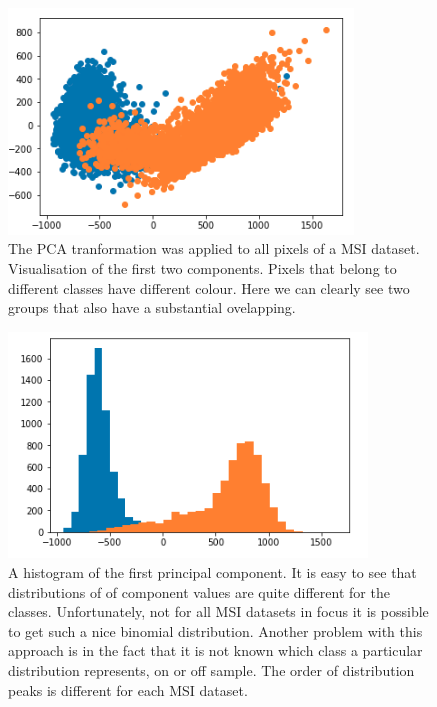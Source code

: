 \documentclass[a4paper]{article}
\begin{document}
\begin{figure}[H]
    \centering
        \includegraphics[width=\textwidth,height=6cm,keepaspectratio]{pca_2d_plot.png}
    \caption{The PCA tranformation was applied to all pixels of a MSI dataset.
    Visualisation of the first two components.
    Pixels that belong to different classes have different colour. Here we can clearly see two groups that also have
    a substantial ovelapping.}
\end{figure}

\begin{figure}[H]
    \centering
        \includegraphics[width=\textwidth,height=6cm,keepaspectratio]{pca_1d_plot.png}
    \caption{A histogram of the first principal component. It is easy to see that distributions of of component values are
    quite different for the classes. Unfortunately, not for all MSI datasets in focus it is possible to get such
    a nice binomial distribution. Another problem with this approach is in the fact that it is not known which 
    class a particular distribution represents, on or off sample. The order of distribution peaks is different for
    each MSI dataset.}
\end{figure}
\end{document}
